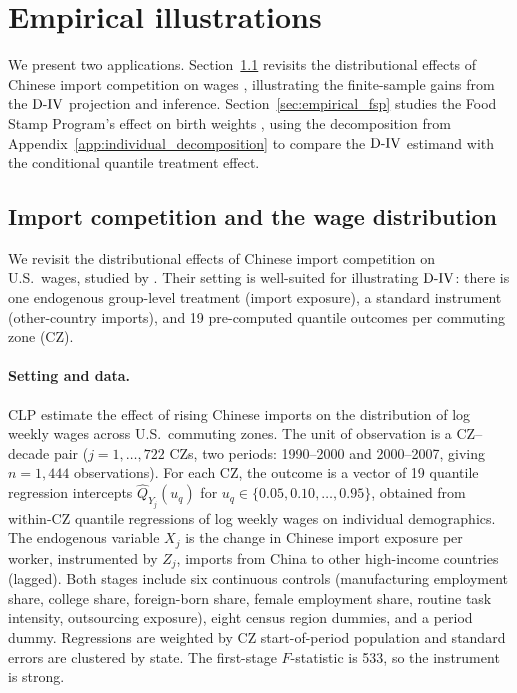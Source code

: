 \documentclass[12pt]{article}
\newcommand{\est}{\ensuremath{\textnormal{D-IV}}\xspace}
\newcommand{\CLP}{CLP\xspace}
\begin{document}
\section{Empirical illustrations}\label{sec:empirical}

We present two applications. Section~\ref{sec:empirical_clp} revisits the distributional effects of Chinese import competition on wages \citep{chetverikov2016iv}, illustrating the finite-sample gains from the \est projection and inference. Section~\ref{sec:empirical_fsp} studies the Food Stamp Program's effect on birth weights \citep{almond2011inside,melly2025minimum}, using the decomposition from Appendix~\ref{app:individual_decomposition} to compare the \est estimand with the conditional quantile treatment effect.

\subsection{Import competition and the wage distribution}\label{sec:empirical_clp}

We revisit the distributional effects of Chinese import competition on U.S.\ wages, studied by \citet{chetverikov2016iv}. Their setting is well-suited for illustrating \est: there is one endogenous group-level treatment (import exposure), a standard instrument (other-country imports), and 19 pre-computed quantile outcomes per commuting zone (CZ).

\paragraph{Setting and data.}
\CLP estimate the effect of rising Chinese imports on the distribution of log weekly wages across U.S.\ commuting zones. The unit of observation is a CZ--decade pair ($j = 1, \ldots, 722$ CZs, two periods: 1990--2000 and 2000--2007, giving $n = 1{,}444$ observations). For each CZ, the outcome is a vector of 19 quantile regression intercepts $\hat{Q}_{Y_j}(u_q)$ for $u_q \in \{0.05, 0.10, \ldots, 0.95\}$, obtained from within-CZ quantile regressions of log weekly wages on individual demographics. The endogenous variable $X_j$ is the change in Chinese import exposure per worker, instrumented by $Z_j$, imports from China to other high-income countries (lagged). Both stages include six continuous controls (manufacturing employment share, college share, foreign-born share, female employment share, routine task intensity, outsourcing exposure), eight census region dummies, and a period dummy. Regressions are weighted by CZ start-of-period population and standard errors are clustered by state. The first-stage $F$-statistic is 533, so the instrument is strong.
\end{document}
